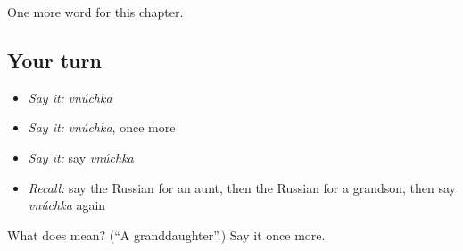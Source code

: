 \begin{grammarlens}[title={What you've built}]
One more word for this chapter.
\end{grammarlens}

\subsection*{Your turn}
\begin{itemize}
\raggedright
  \item \emph{Say it:} \emph{vnúchka}
  \item \emph{Say it:} \emph{vnúchka}, once more
  \item \emph{Say it:} say \emph{vnúchka}
  \item \emph{Recall:} say the Russian for an aunt, then the Russian for a grandson, then say \emph{vnúchka} again
\end{itemize}

\begin{tcolorbox}[breakable,colback=teal!4,colframe=teal!35!black,title={Before you move on}]
What does  mean? (\textquotedblleft{}A granddaughter\textquotedblright{}.) Say it once more.
\end{tcolorbox}
